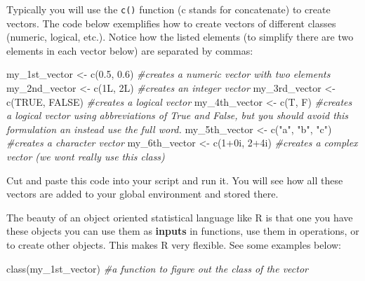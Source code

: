 \documentclass[
]{book}
\newenvironment{Shaded}{\begin{snugshade}}{\end{snugshade}}
\newcommand{\CommentTok}[1]{\textcolor[rgb]{0.56,0.35,0.01}{\textit{#1}}}
\newcommand{\ConstantTok}[1]{\textcolor[rgb]{0.00,0.00,0.00}{#1}}
\newcommand{\DecValTok}[1]{\textcolor[rgb]{0.00,0.00,0.81}{#1}}
\newcommand{\FloatTok}[1]{\textcolor[rgb]{0.00,0.00,0.81}{#1}}
\newcommand{\FunctionTok}[1]{\textcolor[rgb]{0.00,0.00,0.00}{#1}}
\newcommand{\NormalTok}[1]{#1}
\newcommand{\OtherTok}[1]{\textcolor[rgb]{0.56,0.35,0.01}{#1}}
\newcommand{\SpecialCharTok}[1]{\textcolor[rgb]{0.00,0.00,0.00}{#1}}
\newcommand{\StringTok}[1]{\textcolor[rgb]{0.31,0.60,0.02}{#1}}
\begin{document}
Typically you will use the \texttt{c()} function (c stands for concatenate) to create vectors. The code below exemplifies how to create vectors of different classes (numeric, logical, etc.). Notice how the listed elements (to simplify there are two elements in each vector below) are separated by commas:

\begin{Shaded}
\begin{Highlighting}[]
\NormalTok{my\_1st\_vector }\OtherTok{\textless{}{-}} \FunctionTok{c}\NormalTok{(}\FloatTok{0.5}\NormalTok{, }\FloatTok{0.6}\NormalTok{) }\CommentTok{\#creates a numeric vector with two elements}
\NormalTok{my\_2nd\_vector }\OtherTok{\textless{}{-}} \FunctionTok{c}\NormalTok{(1L, 2L) }\CommentTok{\#creates an integer vector}
\NormalTok{my\_3rd\_vector }\OtherTok{\textless{}{-}} \FunctionTok{c}\NormalTok{(}\ConstantTok{TRUE}\NormalTok{, }\ConstantTok{FALSE}\NormalTok{) }\CommentTok{\#creates a logical vector}
\NormalTok{my\_4th\_vector }\OtherTok{\textless{}{-}} \FunctionTok{c}\NormalTok{(T, F) }\CommentTok{\#creates a logical vector using abbreviations of True and False, but you should avoid this formulation an instead use the full word.}
\NormalTok{my\_5th\_vector }\OtherTok{\textless{}{-}} \FunctionTok{c}\NormalTok{(}\StringTok{"a"}\NormalTok{, }\StringTok{"b"}\NormalTok{, }\StringTok{"c"}\NormalTok{) }\CommentTok{\#creates a character vector}
\NormalTok{my\_6th\_vector }\OtherTok{\textless{}{-}} \FunctionTok{c}\NormalTok{(}\DecValTok{1}\SpecialCharTok{+}\NormalTok{0i, }\DecValTok{2}\SpecialCharTok{+}\NormalTok{4i) }\CommentTok{\#creates a complex vector (we won\textquotesingle{}t really use this class)}
\end{Highlighting}
\end{Shaded}

Cut and paste this code into your script and run it. You will see how all these vectors are added to your global environment and stored there.

The beauty of an object oriented statistical language like R is that one you have these objects you can use them as \textbf{inputs} in functions, use them in operations, or to create other objects. This makes R very flexible. See some examples below:

\begin{Shaded}
\begin{Highlighting}[]
\FunctionTok{class}\NormalTok{(my\_1st\_vector) }\CommentTok{\#a function to figure out the class of the vector}
\end{Highlighting}
\end{Shaded}
\end{document}

